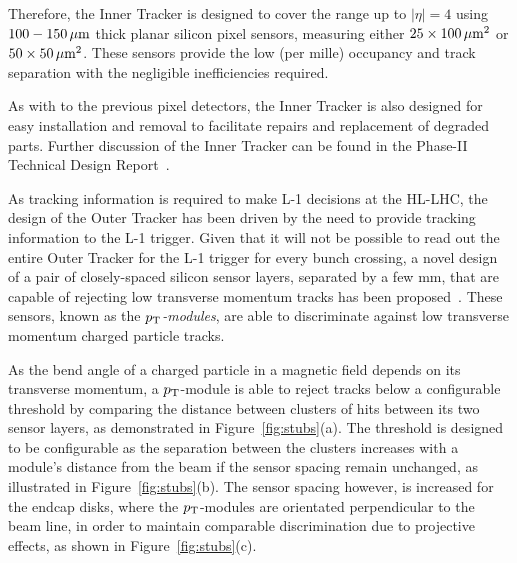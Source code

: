Therefore, the Inner Tracker is designed to cover the range up to $|\eta| = 4$ using $100-150\,\mu\text{m}$ thick planar silicon pixel sensors, measuring either $25\times100\,\mu\text{m}^{2}$ or $50\times50\,\mu\text{m}^{2}$.
These sensors provide the low (per mille) occupancy and track separation with the negligible inefficiencies required.

As with to the previous pixel detectors, the Inner Tracker is also designed for easy installation and removal to facilitate repairs and replacement of degraded parts.
Further discussion of the Inner Tracker can be found in the Phase-II Technical Design Report~\cite{P2TrackerTDR}.

As tracking information is required to make L-1 decisions at the HL-LHC, the design of the Outer Tracker has been driven by the need to provide tracking information to the L-1 trigger.
Given that it will not be possible to read out the entire Outer Tracker for the L-1 trigger for every bunch crossing, a novel design of a pair of closely-spaced silicon sensor layers, separated by a few mm, that are capable of rejecting low transverse momentum tracks has been proposed~\cite{jjonespixel,markthesis}.
These sensors, known as the \emph{$p_{\mathrm{T}}$-modules}, are able to discriminate against low transverse momentum charged particle tracks.

As the bend angle of a charged particle in a magnetic field depends on its transverse momentum, a $p_{\mathrm{T}}$-module is able to  reject tracks below a configurable \pT threshold by comparing the distance between clusters of hits between its two sensor layers, as demonstrated in Figure~\ref{fig:stubs}(a).
The \pT threshold is designed to be configurable as the separation between the clusters increases with a module's distance from the beam if the sensor spacing remain unchanged, as illustrated in Figure~\ref{fig:stubs}(b).
The sensor spacing however, is increased for the endcap disks, where the $p_{\mathrm{T}}$-modules are orientated perpendicular to the beam line, in order to maintain comparable discrimination due to projective effects, as shown in Figure~\ref{fig:stubs}(c).

